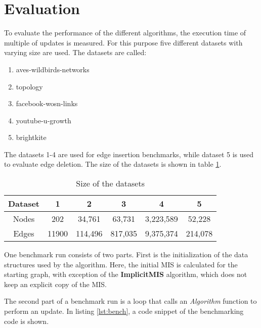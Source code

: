 \documentclass[letterpaper,11pt]{article}
\begin{document}
\section{Evaluation}
\label{Evaluation}

To evaluate the performance of the different algorithms, the execution time of
multiple of updates is measured.
For this purpose five different datasets with varying size are used. 
The datasets are called:

\begin{enumerate}
  \itemsep 0em
  \item aves-wildbirds-networks \cite{wildbirds}
  \item topology \cite{konect:2016:topology, konect:zhang05, konect}
  \item facebook-wosn-links \cite{konect:2016:facebook-wosn-links, viswanath09, konect}
  \item youtube-u-growth \cite{konect:2016:youtube-u-growth, konect:mislove2, konect}
  \item brightkite \cite{konect:2016:loc-brightkite_edges, konect:cho2011, konect}
\end{enumerate}

The datasets 1-4 are used for edge insertion benchmarks, while dataset 5 is
used to evaluate edge deletion. The size of the datasets is shown in table \ref{tab:datasets}.

\begin{table}[h]
  \caption{Size of the datasets}
  \label{tab:datasets}
  \centering
  \setlength{\extrarowheight}{0.3em}
  \begin{tabular}{|c|c|c|c|c|c|}
    \hline
    Dataset & 1 & 2 & 3 & 4 & 5 \\
    \hline
    \hline
    Nodes & 202 & 34,761 & 63,731 & 3,223,589 & 52,228 \\
    \hline
    Edges & 11900 & 114,496 & 817,035 & 9,375,374 & 214,078 \\
    \hline
  \end{tabular}
\end{table}

One benchmark run consists of two parts. First is the initialization of the data
structures used by the algorithm. Here, the initial MIS is calculated for the
starting graph, with exception of the \textbf{ImplicitMIS} algorithm, which does
not keep an explicit copy of the MIS.

The second part of a benchmark run is a loop that calls an \textit{Algorithm}
function to perform an update. In listing \ref{lst:bench}, a code snippet of the
benchmarking code is shown.
\end{document}
